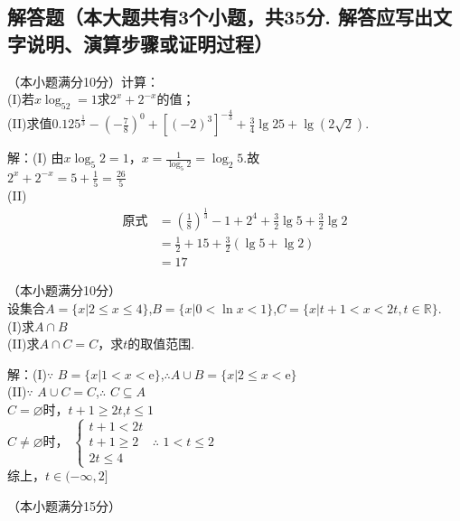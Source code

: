 \begin{exercise}
\section{解答题（本大题共有3个小题，共35分. 解答应写出文字说明、演算步骤或证明过程）}
\item
（本小题满分10分）计算：\\
(I)若$x\log_52=1$求$2^x+2^{-x}$的值；\\
(II)求值$0.125^{\frac{1}3}-(-\frac78)^0+[(-2)^3]^{-\frac43}+\frac{3}4\lg 25+\lg(2\sqrt2)$.\\
\begin{answer}
  解：(I) 由$x\log_5 2=1$，$x=\frac{1}{\log_5 2}=\log_2 5$.故\\
  $2^x+2^{-x}=5+\frac15=\frac{26}5$\\
  (II)
  \begin{equation*}
    \begin{align}
      \text{原式}
      &=(\frac18)^{\frac13}-1+2^4+\frac32\lg{5}+\frac32\lg2\\
      &=\frac12+15+\frac32(\lg5+\lg2)\\
      &=17
    \end{align}
  \end{equation*}
\end{answer}
\vspace{3cm}
\item
（本小题满分10分）\\
设集合$A=\{x|2\leq x\leq4\}$,$B=\{x|0<\ln x<1\}$,$C=\{x|t+1<x<2t,t\in\mathbb{R}\}$.\\
(I)求$A\cap B$\\
(II)求$A\cap C=C$，求$t$的取值范围.\\
\begin{answer}
解：(I)$\because$ $B=\{x|1<x<\mathrm{e}\}$,$\therefore$$A\cup B=\{x|2\leq x<\mathrm{e}\}$\\
(II)$\because$ $A\cup C=C$,$\therefore$ $C\subseteq A$\\
$C=\varnothing$时，$t+1\geq 2t$,$t\leq 1$\\
$C\neq\varnothing$时，
$\begin{cases}
  t+1<2t\\
  t+1\geq 2\\
  2t\leq 4
\end{cases}
$
$\therefore$ $1<t\leq 2$\\
综上，$t\in (-\infty,2]$
\end{answer}
\vspace{4cm}
\item
（本小题满分15分）\\

\end{exercise}
